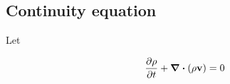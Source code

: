 
\subsection{Continuity equation}

Let 

\begin{equation}
	\pdv{\rho}{t} + \div(\rho \vb{v}) = 0
\end{equation}

